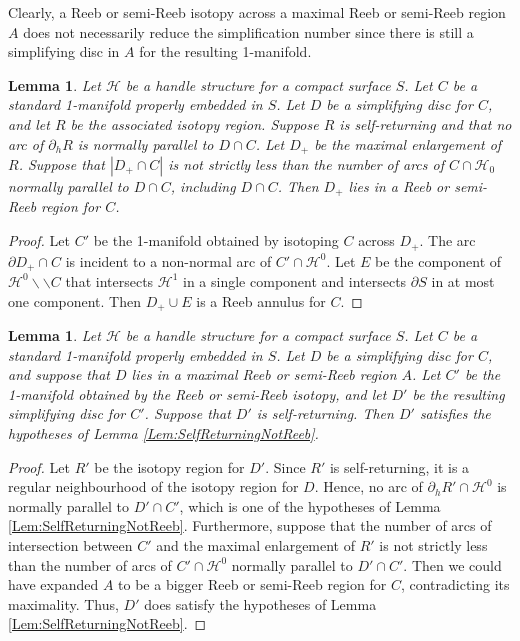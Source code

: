 \documentclass[oneside]{amsart}
\numberwithin{equation}{section}
\theoremstyle{plain}
\newtheorem{lemma}[equation]{Lemma}
\theoremstyle{definition}
\newcommand{\cut}{\backslash\backslash}
\newcommand{\calH}{\mathcal{H}}
\begin{document}
Clearly, a Reeb or semi-Reeb isotopy across a maximal Reeb or semi-Reeb region $A$ does not necessarily reduce the simplification number since there is still a simplifying disc  in $A$ for the resulting 1-manifold. %


\begin{lemma}
\label{Lem:ReebConclusion}
Let $\calH$ be a handle structure for a compact surface $S$. Let $C$ be a standard 1-manifold properly embedded in $S$. Let $D$ be a simplifying disc for $C$, and let $R$ be the associated isotopy region. Suppose $R$ is self-returning and that no arc of $\partial_hR$ is normally parallel to $D \cap C$. Let $D_+$ be the maximal enlargement of $R$. Suppose that $|D_+ \cap C|$ is not strictly less than the number of arcs of $C \cap \calH_0$ normally parallel to $D \cap C$, including $D \cap C$. Then $D_+$ lies in a Reeb or semi-Reeb region for $C$.
\end{lemma}

\begin{proof}
Let $C'$ be the 1-manifold obtained by isotoping $C$ across $D_+$.
The arc $\partial D_+ \cap C$ is incident to a non-normal arc of $C' \cap \calH^0$. Let $E$ be the component of $\calH^0 \cut C$ that intersects $\calH^1$ in a single component and intersects $\partial S$ in at most one component. Then $D_+ \cup E$ is a Reeb annulus for $C$.
\end{proof}

\begin{lemma}
\label{Lem:ReebIsotopy}
Let $\calH$ be a handle structure for a compact surface $S$. Let $C$ be a standard 1-manifold properly embedded in $S$. Let $D$ be a simplifying disc for $C$, and suppose that $D$ lies in a maximal Reeb or semi-Reeb region $A$. Let $C'$ be the 1-manifold obtained by the Reeb or semi-Reeb isotopy, and let $D'$ be the resulting simplifying disc for $C'$. Suppose that $D'$ is self-returning. Then $D'$ satisfies the hypotheses of Lemma \ref{Lem:SelfReturningNotReeb}.
\end{lemma}

\begin{proof}
Let $R'$ be the isotopy region for $D'$. Since $R'$ is self-returning, it is a regular neighbourhood of the isotopy region for $D$. Hence, no arc of $\partial_h R' \cap \calH^0$ is normally parallel to $D' \cap C'$, which is one of the hypotheses of Lemma \ref{Lem:SelfReturningNotReeb}. Furthermore, suppose that the number of arcs of intersection between $C'$ and the maximal enlargement of $R'$ is not strictly less than the number of arcs of $C' \cap \calH^0$ normally parallel to $D' \cap C'$. Then we could have expanded $A$ to be a bigger Reeb or semi-Reeb region for $C$, contradicting its maximality. Thus, $D'$ does satisfy the hypotheses of Lemma \ref{Lem:SelfReturningNotReeb}.
\end{proof}
\end{document}
